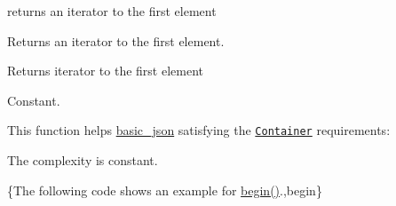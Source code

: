 returns an iterator to the first element 

Returns an iterator to the first element.

 \begin{DoxyReturn}{Returns}
iterator to the first element
\end{DoxyReturn}
Constant.

This function helps {\ttfamily \hyperlink{classnlohmann_1_1basic__json}{basic\-\_\-json}} satisfying the \href{http://en.cppreference.com/w/cpp/concept/Container}{\tt Container} requirements\-:
\begin{DoxyItemize}
\item The complexity is constant.
\end{DoxyItemize}

\{The following code shows an example for {\ttfamily \hyperlink{classnlohmann_1_1basic__json_ad4e381c54039607be08d7af41a1f6ad1}{begin()}}.,begin\}

